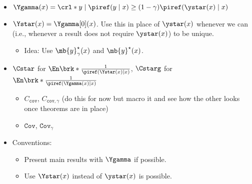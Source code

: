 {\begin{itemize}
 \item $\Ygamma(x)=\crl*{y\mid{}
     \piref(y\mid{}x)\geq{}(1-\gamma)\piref(\ystar(x)\mid x)}$
 \item $\Ystar(x)=\Ygamma[0](x)$. Use this in place of $\ystar(x)$
   whenever we can (i.e., whenever a result does not require
   $\ystar(x)$) to be unique.
   \begin{itemize}
   \item Idea: Use $\mb{y}^{\star}_{\gamma}(x)$ and $\mb{y}^{\star}(x)$.
   \end{itemize}
 \item $\Cstar$ for $\En\brk*{\frac{1}{\piref(\Ystar(x)\mid{}x)}}$,
   $\Cstarg$ for $\En\brk*{\frac{1}{\piref(\Ygamma(x)\mid{}x)}}$
   \begin{itemize}
   \item $C_{\texttt{cov}}$, $C_{\texttt{cov},\gamma}$ (do this for
     now but macro it and see how the other looks once theorems are in place)
   \item $\texttt{Cov}$, $\texttt{Cov}_{\gamma}$
   \end{itemize}
 \item Conventions:
   \begin{itemize}
   \item Present main results with $\Ygamma$ if possible.
   \item Use $\Ystar(x)$ instead of $\ystar(x)$ is possible.
   \end{itemize}
 \end{itemize}
}

